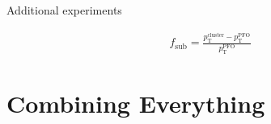 \begin{table}[htb]
  \centering
  
  \caption{Additional experiments}
  \label{tab:pfo_add_experiments}
\end{table}

\begin{align*}
  f_\text{sub} = \frac{p_{\text{T}}^{\text{cluster}} - p_{\text{T}}^{\text{PFO}}}{p_{\text{T}}^{\text{PFO}}}
\end{align*}



\section{Combining Everything}


